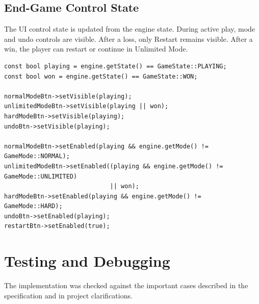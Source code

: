 \documentclass[a4paper,12pt]{article}
\begin{document}
\subsection*{End-Game Control State}

The UI control state is updated from the engine state. During active play, mode and undo controls are visible. After a loss, only Restart remains visible. After a win, the player can restart or continue in Unlimited Mode.

\begin{lstlisting}[style=CppStyle,caption={Control visibility and availability}]
const bool playing = engine.getState() == GameState::PLAYING;
const bool won = engine.getState() == GameState::WON;

normalModeBtn->setVisible(playing);
unlimitedModeBtn->setVisible(playing || won);
hardModeBtn->setVisible(playing);
undoBtn->setVisible(playing);

normalModeBtn->setEnabled(playing && engine.getMode() != GameMode::NORMAL);
unlimitedModeBtn->setEnabled((playing && engine.getMode() != GameMode::UNLIMITED)
                             || won);
hardModeBtn->setEnabled(playing && engine.getMode() != GameMode::HARD);
undoBtn->setEnabled(playing);
restartBtn->setEnabled(true);
\end{lstlisting}

\section{Testing and Debugging}

The implementation was checked against the important cases described in the specification and in project clarifications.
\end{document}
